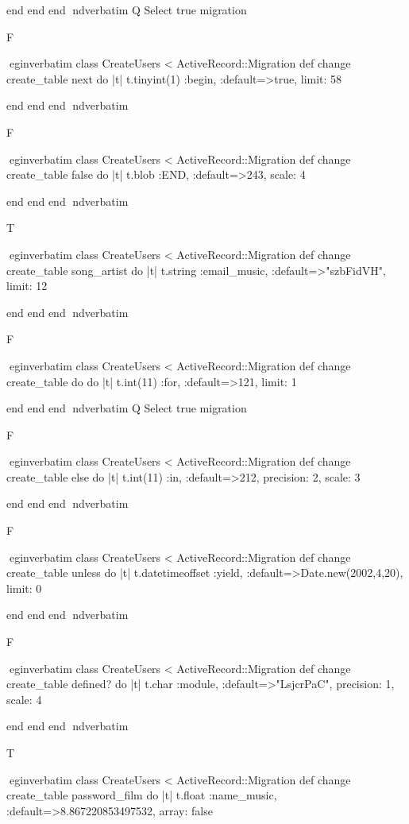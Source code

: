     end 
  end 
end
nd{verbatim}
Q
 Select true migration

F

egin{verbatim}
 class CreateUsers < ActiveRecord::Migration 
  def change 
    create_table next do |t| 
      t.tinyint(1) :begin, :default=>true, limit: 58
    
    end 
  end 
end
nd{verbatim}

F

egin{verbatim}
 class CreateUsers < ActiveRecord::Migration 
  def change 
    create_table false do |t| 
      t.blob :END, :default=>243, scale: 4
    
    end 
  end 
end
nd{verbatim}

T

egin{verbatim}
 class CreateUsers < ActiveRecord::Migration 
  def change 
    create_table song_artist do |t| 
      t.string :email_music, :default=>"szbFidVH", limit: 12
    
    end 
  end 
end
nd{verbatim}

F

egin{verbatim}
 class CreateUsers < ActiveRecord::Migration 
  def change 
    create_table do do |t| 
      t.int(11) :for, :default=>121, limit: 1
    
    end 
  end 
end
nd{verbatim}
Q
 Select true migration

F

egin{verbatim}
 class CreateUsers < ActiveRecord::Migration 
  def change 
    create_table else do |t| 
      t.int(11) :in, :default=>212, precision: 2, scale: 3
    
    end 
  end 
end
nd{verbatim}

F

egin{verbatim}
 class CreateUsers < ActiveRecord::Migration 
  def change 
    create_table unless do |t| 
      t.datetimeoffset :yield, :default=>Date.new(2002,4,20), limit: 0
    
    end 
  end 
end
nd{verbatim}

F

egin{verbatim}
 class CreateUsers < ActiveRecord::Migration 
  def change 
    create_table defined? do |t| 
      t.char :module, :default=>"LsjcrPaC", precision: 1, scale: 4
    
    end 
  end 
end
nd{verbatim}

T

egin{verbatim}
 class CreateUsers < ActiveRecord::Migration 
  def change 
    create_table password_film do |t| 
      t.float :name_music, :default=>8.867220853497532, array: false
    
